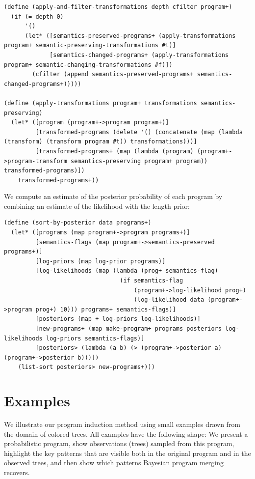 \documentclass[a4paper,10pt]{article}
\begin{document}
\begin{lstlisting}[frame=trbl]
(define (apply-and-filter-transformations depth cfilter program+)
  (if (= depth 0)
      '()
      (let* ([semantics-preserved-programs+ (apply-transformations program+ semantic-preserving-transformations #t)]
             [semantics-changed-programs+ (apply-transformations program+ semantic-changing-transformations #f)])
        (cfilter (append semantics-preserved-programs+ semantics-changed-programs+)))))

(define (apply-transformations program+ transformations semantics-preserving)
  (let* ([program (program+->program program+)]
         [transformed-programs (delete '() (concatenate (map (lambda (transform) (transform program #t)) transformations)))]
         [transformed-programs+ (map (lambda (program) (program+->program-transform semantics-preserving program+ program)) transformed-programs)])
    transformed-programs+))
\end{lstlisting}
We compute an estimate of the posterior probability of each program by combining an estimate of the likelihood with the length prior:
\begin{lstlisting}[frame=trbl]
(define (sort-by-posterior data programs+)
  (let* ([programs (map program+->program programs+)]
         [semantics-flags (map program+->semantics-preserved programs+)]
         [log-priors (map log-prior programs)]
         [log-likelihoods (map (lambda (prog+ semantics-flag)
                                 (if semantics-flag
                                     (program+->log-likelihood prog+)
                                     (log-likelihood data (program+->program prog+) 10))) programs+ semantics-flags)]
         [posteriors (map + log-priors log-likelihoods)] 
         [new-programs+ (map make-program+ programs posteriors log-likelihoods log-priors semantics-flags)]
         [posteriors> (lambda (a b) (> (program+->posterior a) (program+->posterior b)))])
    (list-sort posteriors> new-programs+)))
\end{lstlisting}


\newpage
\section{Examples}

We illustrate our program induction method using small examples drawn from the domain of colored trees. All examples have the following shape: We present a probabilistic program, show observations (trees) sampled from this program, highlight the key patterns that are visible both in the original program and in the observed trees, and then show which patterns Bayesian program merging recovers.
\end{document}
